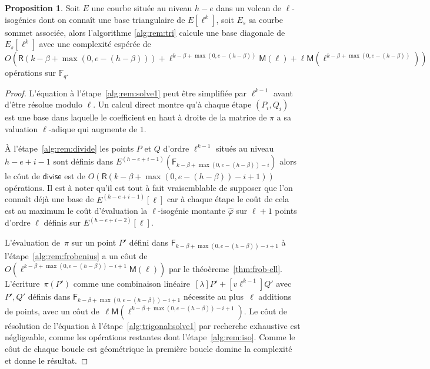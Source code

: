 \documentclass[10pt,a4paper]{book}
\theoremstyle{plain}
\theoremstyle{definition}
\theoremstyle{definition}
\theoremstyle{definition}
\newtheorem{prop}[thm]{Proposition}
\theoremstyle{definition}
\theoremstyle{remark}
\theoremstyle{remark}
\theoremstyle{definition}
\begin{document}
\begin{prop}
\label{pro:alg:rem:tri}
Soit $E$ une courbe située au niveau $h-e$ dans un volcan de $\ell$-isogénies 
dont on connaît une base triangulaire de $E[\ell^k]$, soit $E_s$ sa courbe 
sommet associée, alors l'algorithme \ref{alg:rem:tri} calcule une base 
diagonale de $E_s[\ell^k]$ avec une complexité espérée de $O( \mathsf{R}(k-
\beta+\max(0,e-(h-\beta))) + \ell^{k-\beta+\max(0,e-(h-\beta))}\mathsf{M}(\ell) 
+ \ell\mathsf{M}(\ell^{k-\beta+\max(0,e-(h-\beta))}))$ opérations sur 
$\mathbb{F}_q$.
\end{prop}

\begin{proof}
L'équation à l'étape~\ref{alg:rem:solve1} peut être simplifiée par $\ell^{k-1}$
avant d'être résolue modulo $\ell$. Un calcul direct montre qu'à chaque étape 
$(P_i,Q_i)$ est une base dans laquelle le coefficient en haut à droite de la 
matrice de $\pi$ a sa valuation $\ell$-adique qui augmente de $1$. 


\`A l'étape~\ref{alg:rem:divide} les points $P$ et $Q$ d'ordre $\ell^{k-1}$ 
situés au niveau $h-e+i-1$ sont définis dans $E^{(h-e+i-1)}(\mathsf{F}_{k-\beta
+\max(0,e-(h-\beta))-i})$ alors le côut de $\mathsf{divise}$
 est de $O(\mathsf{R}(k-\beta+\max(0,e-(h-\beta))-i+1))$ opérations.
 Il est à noter qu'il est tout à fait vraisemblable de supposer que l'on 
 connaît déjà une base de $E^{(h-e+i-1)}[\ell]$ car à chaque étape le coût de cela
 est au maximum le coût d'évaluation la $\ell$-isogénie montante 
 $\widehat{\varphi}$ sur $\ell+1$ points d'ordre $\ell$ définis sur 
 $E^{(h-e+i-2)}[\ell]$.

  L'évaluation de~$\pi$ sur un point $P'$ défini dans 
  $\mathsf{F}_{k-\beta+\max(0,e-(h-\beta))-i+1}$ à l'étape~\ref{alg:rem:frobenius} a un côut
  de~$O(\ell^{k-\beta+\max(0,e-(h-\beta))-i+1}\mathsf{M}(\ell))$ par le théoèreme~\ref{thm:frob-ell}.
  L'écriture~$\pi(P')$ comme une combinaison linéaire~$[\lambda] P' + [v\ell^{k-1}] Q'$ 
  avec $P',Q'$ définis dans $\mathsf{F}_{k-\beta+\max(0,e-(h-\beta))-i+1}$  nécessite au plus~$\ell$
  additions de points, avec un côut de~$\ell \mathsf{M}(\ell^{k-\beta+\max(0,e-(h-\beta))-i+1})$.
  Le côut de résolution de l'équation à l'étape~\ref{alg:trigonal:solve1}
  par recherche exhaustive est négligeable, comme les 
  opérations restantes dont l'étape~\ref{alg:rem:iso}.
  Comme le côut de chaque boucle est géométrique
  la première boucle domine la complexité et donne le résultat.
\end{proof}
\end{document}

